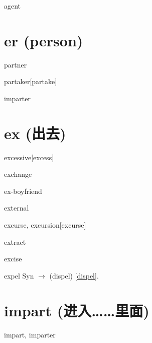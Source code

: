 \begin{wordRef}{agent}
\end{wordRef}

\section{er (person)}

\begin{wordRef}{partner}
\end{wordRef}

\begin{wordRef}{partaker}[partake]
\end{wordRef}

\begin{wordRef}{imparter}
\end{wordRef}

\section{ex (出去)}

\begin{wordRef}{excessive}[excess]
\end{wordRef}

\begin{wordRef}{exchange}
\end{wordRef}

\begin{wordRef}{ex-boyfriend}
\end{wordRef}

\begin{wordRef}{external}
\end{wordRef}

\begin{wordRef}{excurse, excursion}[excurse]
\end{wordRef}

\begin{wordRef}{extract}
\end{wordRef}

\begin{wordRef}{excise}
\end{wordRef}

\begin{wordRef}{expel}
    Syn $\rightarrow$ (dispel) \ref{dispel}.
\end{wordRef}

\section{impart (进入……里面)}
\begin{wordRef}{impart, imparter}
\end{wordRef}

